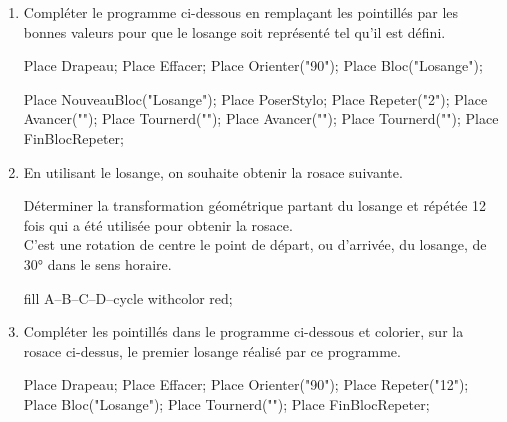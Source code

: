 \begin{corrige}
    \begin{enumerate}
        \item Compléter le programme ci-dessous en remplaçant les pointillés par les bonnes valeurs pour que le losange soit représenté tel qu'il est défini.\\
        \begin{Scratch}[Echelle=0.7]
            Place Drapeau;
            Place Effacer;
            Place Orienter("90");
            Place Bloc("Losange");
        \end{Scratch}
        \hspace*{10mm}
        \begin{Scratch}[Echelle=0.7]
            Place NouveauBloc("Losange");
            Place PoserStylo;
            Place Repeter("2");
            Place Avancer("{}");
            Place Tournerd("{}");
            Place Avancer("{}");
            Place Tournerd("{}");
            Place FinBlocRepeter;        
        \end{Scratch}    
        \item En utilisant le losange, on souhaite obtenir la rosace suivante.\\
        \begin{minipage}{0.6\linewidth}
            Déterminer la transformation géométrique partant du losange et répétée \num{12} fois qui a été utilisée pour obtenir la rosace.\\
            {\red C'est une rotation de centre le point de départ, ou d'arrivée, du losange, de \ang{30} dans le sens horaire.}
        \end{minipage}
        \begin{minipage}{0.35\linewidth}
            \begin{Geometrie}[CoinHD={(4u,4u)}]        
                \enonceTroisiemeGTroisExoQuatorze
                fill A--B--C--D--cycle withcolor red;
            \end{Geometrie}   
        \end{minipage} 
    \end{enumerate}
    \Coupe
    \begin{enumerate}
        \setcounter{enumi}{2}
        \item Compléter les pointillés dans le programme ci-dessous et colorier, sur la rosace ci-dessus, le premier losange réalisé par ce programme.\\
        \begin{Scratch}[Echelle=0.7]
            Place Drapeau;
            Place Effacer;
            Place Orienter("90");
            Place Repeter("12");
            Place Bloc("Losange");
            Place Tournerd("{}");
            Place FinBlocRepeter;
        \end{Scratch}
    \end{enumerate}  
\end{corrige}

